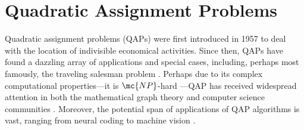 \documentclass[10pt,journal,cspaper,compsoc]{IEEEtran}
\begin{document}


\section{Quadratic Assignment Problems} %
\label{ssub:linear_assignment_problems}



Quadratic assignment problems (QAPs) were first introduced in 1957 to deal with the location of indivisible economical activities.  Since then, QAPs have found a dazzling array of applications and special cases, including, perhaps most famously, the traveling salesman problem \cite{Burkard2009}.    Perhaps due to its complex computational properties---it is $\mc{NP}$-hard \cite{Garey1979}---QAP  has received widespread attention in both the mathematical graph theory and computer science communities \cite{Conte2004}.  Moreover, the potential span of applications of QAP algorithms is vast, ranging from neural coding \cite{Richiardi2010} to machine vision \cite{Wiskott1997}. 
\end{document}

